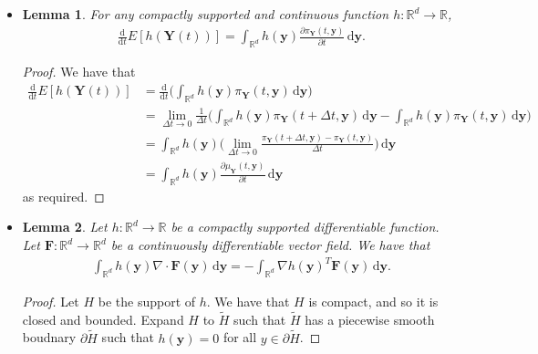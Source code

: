 \documentclass[10pt]{article}
\newtheorem{lemma}{Lemma}
\newcommand{\dee}{\mathrm{d}}
\newcommand{\ve}[1]{\mathbf{#1}}
\newcommand{\Real}{\mathbb{R}}
\begin{document}
\begin{itemize}
  \item \begin{lemma} \label{thm:dhy-lemma}
    For any compactly supported and continuous function $h: \Real^d \rightarrow \Real$, 
    \begin{align*}
      \frac{\dee}{\dee t} E[h(\ve{Y}(t))] = \int_{\Real^d} h(\ve{y}) \frac{\partial \pi_{\ve{Y}}(t,\ve{y})}{\partial t}\, \dee \ve{y}.
    \end{align*}
  \end{lemma}
  \begin{proof}
    We have that
    \begin{align*}
      \frac{\dee}{\dee t} E[h(\ve{Y}(t))]
      &= \frac{\dee}{\dee t} \bigg( \int_{\Real^d} h(\ve{y}) \pi_{\ve{Y}}(t, \ve{y})\, \dee\ve{y} \bigg) \\
      &= \lim_{\Delta t \rightarrow 0} \frac{1}{\Delta t} \bigg( \int_{\Real^d} h(\ve{y}) \pi_{\ve{Y}}(t+\Delta t, \ve{y})\, \dee\ve{y} - \int_{\Real^d} h(\ve{y}) \pi_{\ve{Y}}(t, \ve{y})\, \dee\ve{y} \bigg) \\
      &= \int_{\Real^d} h(\ve{y}) \bigg( \lim_{\Delta t \rightarrow 0} \frac{\pi_{\ve{Y}}(t+\Delta t, \ve{y}) - \pi_{\ve{Y}}(t, \ve{y})}{\Delta t} \bigg)\, \dee\ve{y} \\
      &= \int_{\Real^d} h(\ve{y}) \frac{\partial \mu_{\ve{Y}}(t, \ve{y})}{\partial t} \, \dee\ve{y}
    \end{align*}
    as required.
  \end{proof}

  \item \begin{lemma} \label{thm:h-divergence-lemma}
    Let $h: \Real^d \rightarrow \Real$ be a compactly supported differentiable function. Let $\ve{F}: \Real^d \rightarrow \Real^d$ be a continuously differentiable vector field. We have that
    \begin{align*}
      \int_{\Real^d} h(\ve{y}) \nabla \cdot \ve{F}(\ve{y})\, \dee\ve{y} = - \int_{\Real^d} \nabla h(\ve{y})^T \ve{F}(\ve{y})\, \dee\ve{y}.
    \end{align*}  
  \end{lemma}
  \begin{proof}
    Let $H$ be the support of $h$. We have that $H$ is compact, and so it is closed and bounded. Expand $H$ to $\widetilde{H}$ such that $\widetilde{H}$ has a piecewise smooth boudnary $\partial\widetilde{H}$ such that $h(\ve{y}) = 0$ for all $y \in \partial\widetilde{H}$. 
    

\end{proof}
\end{itemize}
\end{document}
